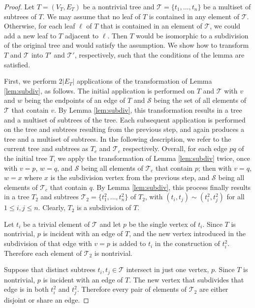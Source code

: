 \documentclass[
final
]{dmtcs-episciences}        \usepackage{graphics, amsthm, amsmath, amssymb, algorithm, algorithmic}
\begin{document}
\begin{proof}
Let $T=(V_T, E_T)$ be a nontrivial tree and $\mathcal{T} = \{ t_1, \ldots, t_n  \}$ be a multiset of subtrees of $T$.
We may assume that no leaf of $T$ is contained in any element of $\mathcal{T}$. Otherwise, for each leaf $\ell$ of $T$ that is contained in an element of $\mathcal{T}$, we could add a new leaf to $T$ adjacent to $\ell$. Then $T$ would be isomorphic to a subdivision of the original tree and would satisfy the assumption. 
We show how to transform $T$ and $\mathcal{T}$ into $T'$ and $\mathcal{T}'$, respectively,  such that the conditions of the lemma are satisfied.


First, 
we perform $2 |E_T|$ applications of the transformation of Lemma \ref{lem:subdiv}, as follows.
The initial application is performed on $T$ and $\mathcal T$ 
with $v$ and $w$ being the endpoints of an edge of $T$ and $\mathcal S$ being the set of all elements of $\mathcal T$ that contain $v$. By Lemma \ref{lem:subdiv}, this transformation
results in a tree and a multiset of subtrees of the tree. Each subsequent application is performed on the tree and subtrees resulting from the previous step, and again produces a tree and a multiset of subtrees. In the following description, we refer to the current tree and subtrees as $T_c$ and $\mathcal T_c$ respectively.
Overall,
for each edge $pq$ of the initial tree $T$, we apply the transformation of Lemma \ref{lem:subdiv} twice, once with $v=p$, $w=q$, and $\mathcal S$ being all elements of $\mathcal T_c$ that contain $p$;
then with $v=q$, $w=x$ where $x$ is the subdivision vertex from the previous step, and
$\mathcal S$ being all elements of $\mathcal T_c$ that contain $q$.
By Lemma \ref{lem:subdiv}, this process finally results in a tree $T_2$ and
subtrees $\mathcal{T}_2= \{ t^2_1, \ldots, t^2_n \}$ of $T_2$, with
$(t_i,t_j) \sim (t^2_i,t^2_j)$ for all $ 1 \le i,j \le n$.
Clearly, $T_2$ is a subdivision of $T$.



Let $t_i$ be a trivial element of $\mathcal{T}$ and let $p$ be the single vertex of $t_i$. Since $T$ is nontrivial, $p$ is incident with an edge of $T$, and the new vertex introduced in the subdivision of that edge with $v=p$ is added to $t_i$ in the construction of $t^2_i$.
Therefore each element of $ \mathcal{T}_2 $ is nontrivial.

Suppose that distinct subtrees $t_i, t_j \in \mathcal{T}$ intersect in just one vertex, $p$. 
Since $T$ is nontrivial, $p$ is incident with an edge of $T$. The new vertex that subdivides that edge is in both $t^2_i$ and $t^2_j$. Therefore every pair of elements of $\mathcal{T}_2$ are either disjoint or share an edge.


\end{proof}
\end{document}
